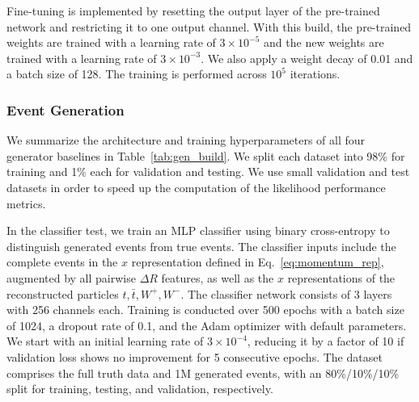 \documentclass[submission, Phys]{SciPost}
\begin{document}
Fine-tuning is implemented by resetting the output layer of the pre-trained network and restricting it to one output channel. With this build, the pre-trained weights are trained with a learning rate of $3 \times 10^{-5}$ and the new weights are trained with a learning rate of $3 \times 10^{-3}$. We also apply a weight decay of 0.01 and a batch size of 128. The training is performed across $10^5$ iterations.

\subsubsection*{Event Generation}

We summarize the architecture and training hyperparameters of all four generator baselines in Table~\ref{tab:gen_build}. We split each dataset into 98\% for training and 1\% each for validation and testing. We use small validation and test datasets in order to speed up the computation of the likelihood performance metrics.

In the classifier test, we train an MLP classifier using binary cross-entropy to distinguish generated events from true events. The classifier inputs include the complete events in the $x$ representation defined in Eq.~\eqref{eq:momentum_rep}, augmented by all pairwise $\Delta R$ features, as well as the $x$ representations of the reconstructed particles $t, \bar t, W^+, W^-$. The classifier network consists of 3 layers with 256 channels each. Training is conducted over 500 epochs with a batch size of 1024, a dropout rate of 0.1, and the Adam optimizer with default parameters. We start with an initial learning rate of $3\times 10^{-4}$, reducing it by a factor of 10 if validation loss shows no improvement for 5 consecutive epochs. The dataset comprises the full truth data and 1M generated events, with an 80\%/10\%/10\% split for training, testing, and validation, respectively.
\end{document}
